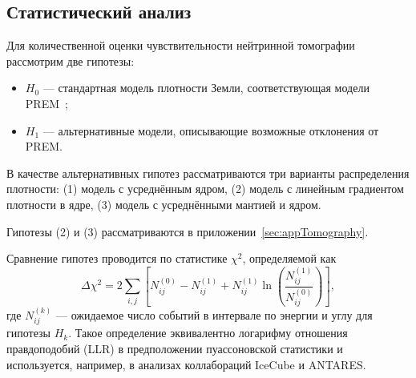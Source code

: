 
\subsection{Статистический анализ}

Для количественной оценки чувствительности нейтринной томографии рассмотрим две гипотезы:  
\begin{itemize}
  \item $H_0$ — стандартная модель плотности Земли, соответствующая модели PREM~\cite{dziewonskiPREM1981};
  \item $H_1$ — альтернативные модели, описывающие возможные отклонения от PREM.
\end{itemize}

В качестве альтернативных гипотез рассматриваются три варианты распределения плотности:  
(1) модель с усреднённым ядром,  
(2) модель с линейным градиентом плотности в ядре,  
(3) модель с усреднёнными мантией и ядром.  

Гипотезы (2) и (3) рассматриваются в приложении~\ref{sec:appTomography}.

Сравнение гипотез проводится по статистике $\chi^2$, определяемой как
\begin{equation}
\label{eq:chi2_def}
\Delta\chi^2 = 2\sum_{i,j}
\left[
  N_{ij}^{(0)} - N_{ij}^{(1)} 
  + N_{ij}^{(1)}\ln\!\left(\frac{N_{ij}^{(1)}}{N_{ij}^{(0)}}\right)
\right],
\end{equation}
где $N^{(k)}_{ij}$ — ожидаемое число событий в интервале по энергии и углу для гипотезы $H_k$.  
Такое определение эквивалентно логарифму отношения правдоподобий (LLR) в предположении пуассоновской статистики и используется, например, в анализах коллабораций IceCube и ANTARES.

